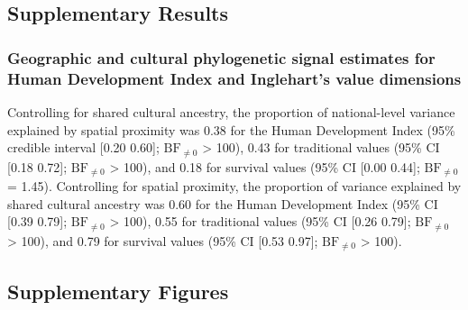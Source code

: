 \begin{appendix}
\newpage

\hypertarget{supplementary-results}{%
\subsection{Supplementary Results}\label{supplementary-results}}

\hypertarget{geographic-and-cultural-phylogenetic-signal-estimates-for-human-development-index-and-ingleharts-value-dimensions}{%
\subsubsection{Geographic and cultural phylogenetic signal estimates for
Human Development Index and Inglehart's value
dimensions}\label{geographic-and-cultural-phylogenetic-signal-estimates-for-human-development-index-and-ingleharts-value-dimensions}}

Controlling for shared cultural ancestry, the proportion of
national-level variance explained by spatial proximity was 0.38 for the
Human Development Index (95\% credible interval {[}0.20 0.60{]};
\(\text{BF}_{\neq0}\) \textgreater{} 100), 0.43 for traditional values
(95\% CI {[}0.18 0.72{]}; \(\text{BF}_{\neq0}\) \textgreater{} 100), and
0.18 for survival values (95\% CI {[}0.00 0.44{]}; \(\text{BF}_{\neq0}\)
= 1.45). Controlling for spatial proximity, the proportion of variance
explained by shared cultural ancestry was 0.60 for the Human Development
Index (95\% CI {[}0.39 0.79{]}; \(\text{BF}_{\neq0}\) \textgreater{}
100), 0.55 for traditional values (95\% CI {[}0.26 0.79{]};
\(\text{BF}_{\neq0}\) \textgreater{} 100), and 0.79 for survival values
(95\% CI {[}0.53 0.97{]}; \(\text{BF}_{\neq0}\) \textgreater{} 100).

\newpage

\hypertarget{supplementary-figures}{%
\subsection{Supplementary Figures}\label{supplementary-figures}}


\end{appendix}
